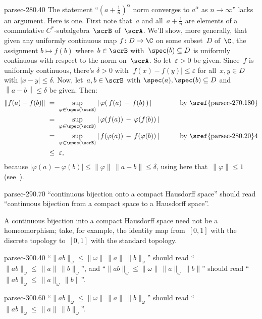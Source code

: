 \documentclass[b5page]{book}
\begin{document}
\begin{addendum}{parsec-280.40}
The statement ``$(a+\frac{1}{n})^\alpha$
norm converges to $a^\alpha$ as $n\to\infty$''
lacks an argument.
Here is one.
First note that~$a$ and all~$a+\frac{1}{n}$
are elements of a commutative $C^*$-subalgebra~$\scrB$
of~$\scrA$.
We'll show, more generally,
that given any uniformly continuous map $f\colon D\to\C$
on some subset~$D$ of~$\C$,
the assignment $b\mapsto f(b)$
where~$b\in \scrB$ with~$\spec(b)\subseteq D$
is uniformly continuous
with respect to the norm on~$\scrA$.
So let~$\varepsilon>0$ be given.
Since~$f$ is uniformly continuous,
there's $\delta>0$ with $\left|f(x)-f(y)\right|\leq\varepsilon$
for all~$x,y\in D$ with $\left|x-y\right|\leq \delta$.
Now, let~$a,b\in \scrB$ with
$\spec(a),\spec(b)\subseteq D$
and~$\left\|a-b\right\|\leq \delta$ be given. Then:
\begin{alignat*}{3}
\|f(a)-f(b)\|
\ &= \ \sup_{\varphi\in \spec(\scrB)}
\left|\,\varphi(\,f(a)\,-\,f(b)\,)\,\right|\qquad
&&\text{by~\sref{parsec-270.180}}
\\
\ &=\ \sup_{\varphi\in\spec(\scrB)}\left|
\,\varphi(f(a))\,-\,\varphi(f(b))\,\right|\qquad
&&
\\
\ &=\ \sup_{\varphi\in\spec(\scrB)}\left|
\,f(\varphi(a))\,-\,f(\varphi(b))\,\right|\qquad
&&\text{by~\sref{parsec-280.20}4}
\\
\ &\leq\ \varepsilon,
\end{alignat*}
because $\left|\varphi(a)-\varphi(b)\right|
\leq \|\varphi\|\,\|a-b\|\leq \delta$,
using here that~$\|\varphi\|\leq 1$
(see~).
\end{addendum}
\begin{erratum}{parsec-290.70}
``continuous bijection onto a compact Hausdorff space''
should read
``continuous bijection from a compact space
to a Hausdorff space''.

A continuous bijection into a compact Hausdorff space need not be a
homeomorphism; take, for example, the identity map from~$[0,1]$
with the discrete topology to~$[0,1]$ with the standard topology.
\end{erratum}
\begin{erratum}{parsec-300.40}
``$\|ab\|_\omega \leq \|\omega\|\,\|a\|\,\|b\|_\omega$''
should read
``$\|ab\|_\omega \leq\,\|a\|\,\|b\|_\omega$'',
and
``$\|ab\|_\omega \leq \|\omega\|\,\|a\|_\omega\,\|b\|$''
should read
``$\|ab\|_\omega \leq\,\|a\|_\omega\,\|b\|$''.
\end{erratum}
\begin{erratum}{parsec-300.60}
``$\|ab\|_\omega \leq \|\omega\|\,\|a\|\,\|b\|_\omega$''
should read
``$\|ab\|_\omega \leq\,\|a\|\,\|b\|_\omega$''.
\end{erratum}
\end{document}
